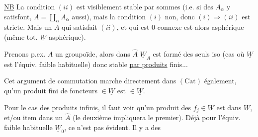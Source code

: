 
 \uline{NB} La condition $(ii)$ est visiblement stable par sommes (i.e. si des $A_\alpha$ y satisfont, $A=\coprod_\alpha A_\alpha$ aussi), mais la condition $(i)$ non, donc   $(i)\Longrightarrow(ii)$ est stricte. Mais un $A$ qui satisfait $(ii)$, et qui est $0$-connexe  est alors asphérique (même tot. $\underline W$-asphérique).

 Prenons p.ex.  $A$ un groupoïde, alors dans $\widehat A$ $\underline W_A$ est formé des seuls iso (cas où $\underline W$ est l'équiv. faible habituelle) donc stable \uline{par produits} finis...

Cet argument de commutation  marche directement dans $(\mathrm{Cat})$ également,   qu'un produit  fini de foncteurs $\in\underline W$ est $\in\underline W$.

Pour le cas des produits infinis, il faut voir qu'un produit des $f_j\in\underline W$ est dans $\underline W$,  et/ou item dans un $\widehat A$ (le deuxième impliquera le premier). Déjà pour l'équiv. faible habituelle $\underline W_0$, ce n'est pas évident. Il y a des
